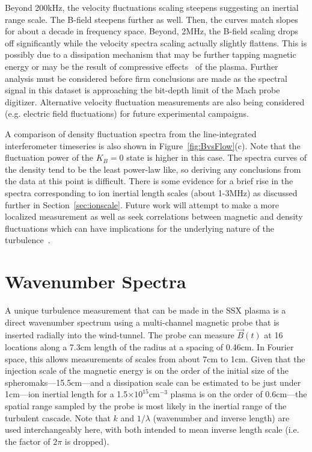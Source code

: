 \documentclass[aip,prl,amsmath,amssymb,reprint,superscriptaddress]{revtex4-1} %
\begin{document}
Beyond 200kHz, the velocity fluctuations scaling steepens suggesting an inertial range scale. The B-field steepens further as well. Then, the curves match slopes for about a decade in frequency space. Beyond, 2MHz, the B-field scaling drops off significantly while the velocity spectra scaling actually slightly flattens. This is possibly due to a dissipation mechanism that may be further tapping magnetic energy or may be the result of compressive effects~\cite{roberts10} of the plasma. Further analysis must be considered before firm conclusions are made as the spectral signal in this dataset is approaching the bit-depth limit of the Mach probe digitizer. Alternative velocity fluctuation measurements are also being considered (e.g. electric field fluctuations) for future experimental campaigns.

A comparison of density fluctuation spectra from the line-integrated interferometer timeseries is also shown in Figure~\ref{fig:BvsFlow}(c). Note that the fluctuation power of the $K_{B}=0$ state is higher in this case. The spectra curves of the density tend to be the least power-law like, so deriving any conclusions from the data at this point is difficult. There is some evidence for a brief rise in the spectra corresponding to ion inertial length scales (about 1-3MHz) as discussed further in Section~\ref{sec:ionscale}. Future work will attempt to make a more localized measurement as well as seek correlations between magnetic and density fluctuations which can have implications for the underlying nature of the turbulence~\cite{klein12}.

\section{Wavenumber Spectra}\label{sec:wavenumber}

A unique turbulence measurement that can be made in the SSX plasma is a direct wavenumber spectrum using a multi-channel magnetic probe that is inserted radially into the wind-tunnel. The probe can measure $\vec{B}(t)$ at 16 locations along a 7.3cm length of the radius at a spacing of 0.46cm. In Fourier space, this allows measurements of scales from about 7cm to 1cm. Given that the injection scale of the magnetic energy is on the order of the initial size of the spheromaks---15.5cm---and a dissipation scale can be estimated to be just under 1cm---ion inertial length for a 1.5$\times 10^{15}$cm$^{-3}$ plasma is on the order of 0.6cm---the spatial range sampled by the probe is most likely in the inertial range of the turbulent cascade. Note that $k$ and $1/\lambda$ (wavenumber and inverse length) are used interchangeably here, with both intended to mean inverse length scale (i.e. the factor of $2\pi$ is dropped).
\end{document}
